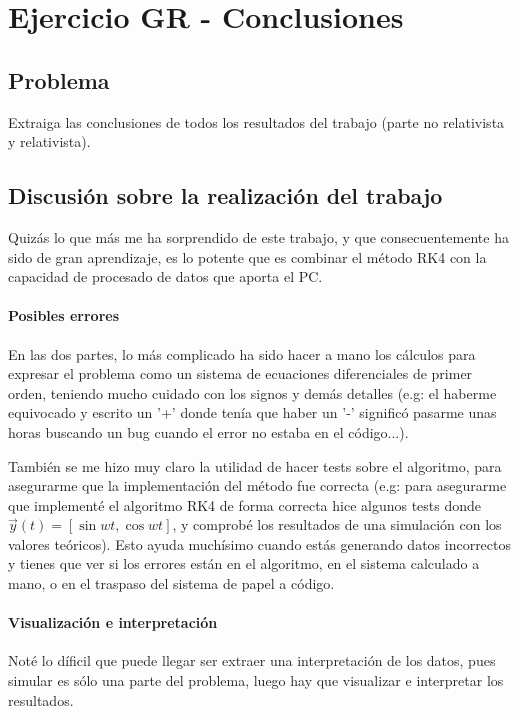 \section{Ejercicio GR - Conclusiones}

\subsection{Problema}

Extraiga las conclusiones de todos los resultados del trabajo (parte no relativista y relativista).


\subsection{Discusión sobre la realización del trabajo}

Quizás lo que más me ha sorprendido de este trabajo, y que consecuentemente ha sido de gran aprendizaje, es lo potente que es combinar el método RK4 con la capacidad de procesado de datos que aporta el PC. 


\paragraph{Posibles errores}
En las dos partes, lo más complicado ha sido hacer a mano los cálculos para expresar el problema como un sistema de ecuaciones diferenciales de primer orden, teniendo mucho cuidado con los signos y demás detalles (e.g: el haberme equivocado y escrito un '+' donde tenía que haber un '-' significó pasarme unas horas buscando un bug cuando el error no estaba en el código...).

También se me hizo muy claro la utilidad de hacer tests sobre el algoritmo, para asegurarme que la implementación del método fue correcta (e.g: para asegurarme que implementé el algoritmo RK4 de forma correcta hice algunos tests donde $\vec{y}(t) = [\sin wt, \cos wt]$, y comprobé los resultados de una simulación con los valores teóricos). Esto ayuda muchísimo cuando estás generando datos incorrectos y tienes que ver si los errores están en el algoritmo, en el sistema calculado a mano, o en el traspaso del sistema de papel a código.

\paragraph{Visualización e interpretación}

Noté lo díficil que puede llegar ser extraer una interpretación de los datos, pues simular es sólo una parte del problema, luego hay que visualizar e interpretar los resultados.  

